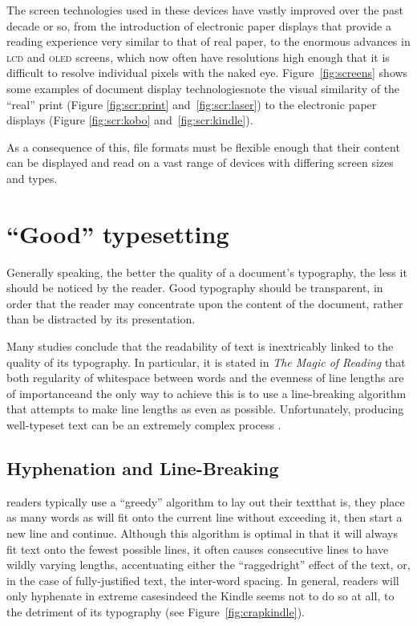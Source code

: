 The screen technologies used in these devices have vastly improved over the past decade or so, from the introduction of electronic paper displays that provide a reading experience very similar to that of real paper, to the enormous advances in \textsc{lcd} and \textsc{oled} screens, which now often have resolutions high enough that it is difficult to resolve individual pixels with the naked eye. Figure~\ref{fig:screens} shows some examples of document display technologies\ed note the visual similarity of the ``real'' print (Figure \ref{fig:scr:print} and~\ref{fig:scr:laser}) to the electronic paper displays (Figure \ref{fig:scr:kobo} and~\ref{fig:scr:kindle}).

As a consequence of this, \ebook{} file formats must be flexible enough that their content can be displayed and read on a vast range of devices with differing screen sizes and types.


\section{``Good'' typesetting}
\label{sec:goodtypesetting}

Generally speaking, the better the quality of a document's typography, the less it should be noticed by the reader. Good typography should be transparent, in order that the reader may concentrate upon the content of the document, rather than be distracted by its presentation.

Many studies\hspace{0pt}\cite{Mittelbach1992,Hill1999,Bringhurst2008,Voorhees2011,Legge2011} conclude that the readability of text is inextricably linked to the quality of its typography. In particular, it is stated in \emph{The Magic of Reading}\hspace{0pt}\cite{Hill1999} that both regularity of whitespace between words and the evenness of line lengths are of importance\ed and the only way to achieve this is to use a line-breaking algorithm that attempts to make line lengths as even as possible. Unfortunately, producing well-typeset text can be an extremely complex process \cite{Hurst2009}.


\subsection{Hyphenation and Line-Breaking}
\Ebook{} readers typically use a ``greedy'' algorithm to lay out their text\ed that is, they place as many words as will fit onto the current line without exceeding it, then start a new line and continue. Although this algorithm is optimal in that it will always fit text onto the fewest possible lines, it often causes consecutive lines to have wildly varying lengths, accentuating either the ``\gls{raggedright}'' effect of the text, or, in the case of fully-justified text, the inter-word spacing. In general, \ebook{} readers will only hyphenate in extreme cases\ed indeed the Kindle seems not to do so at all, to the detriment of its typography (see Figure~\ref{fig:crapkindle}).

